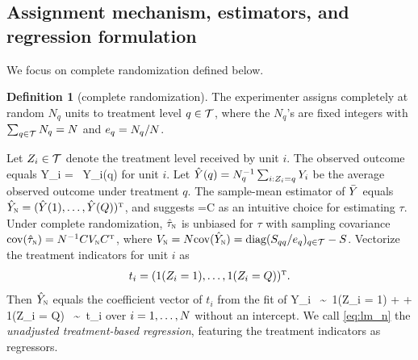 \documentclass[11pt]{article}
\theoremstyle{definition}
\newtheorem{definition}{Definition}
\begin{document}
\subsection{Assignment mechanism, estimators, and regression formulation}
We focus on complete randomization defined below.

\begin{definition}
[complete randomization]\label{def::complete-randomization}
The experimenter assigns completely at random $N_q$ units to treatment level $q\in \mathcal{T}$, where the  $N_q$'s are fixed integers with $\sum_{q\in\mathcal{T}} N_q = N$ and $e_q  = N_q/N$.
\end{definition}


Let $Z_i \in \mathcal{T}$ denote the treatment level received by unit $i$. %
The observed outcome equals 
\beginy\label{eq:obs}
Y_i = \sumq \wiq \, Y_i(q)
\endy for unit $i$. %
Let $\hat Y(q) = N_q^{-1}\sum_{i:Z_i = q}  Y_i$  be the average observed outcome under treatment $q$.
The sample-mean estimator of $\bar Y$ equals $\hat Y_{\textsc{n}} = (\hat Y(1), \dots, \hat Y(Q) )^{ \mathrm{\scriptscriptstyle T} }$, and suggests
\beginy\label{eq:htau_n}
\htn=C\hyn
\endy
as an intuitive choice for estimating $\tau$. 
Under complete randomization, 
$\hat\tau_{\textsc{n}}$ is unbiased for $\tau$ with sampling covariance $\text{cov}(\hat\tau_{\textsc{n}}) = N^{-1} CV_{\textsc{n}} C^{ \mathrm{\scriptscriptstyle T} }$, where $V_{\textsc{n}} =   N\text{cov}(\hat Y_{\textsc{n}} ) = \text{diag}( S_{qq} /e_q )_{q\in\mathcal{T}}  -  S$. 
Vectorize the treatment indicators for unit $i$ as
$$
t_i = (1(Z_i = 1),\dots,1(Z_i = Q))^{ \mathrm{\scriptscriptstyle T} }.
$$
Then $\hat Y_{\textsc{n}}$ equals the coefficient vector of $t_i$ from the \olss fit of 
\beginy\label{eq:lm_n}
Y_i  \ \sim \  1(Z_i = 1) + \cdots + 1(Z_i = Q)  \  \sim \ t_i
\endy
over $i = 1, \ldots,N$ without an intercept. We call \eqref{eq:lm_n} the {\it unadjusted treatment-based regression}, featuring the treatment indicators as regressors. 
\end{document}
